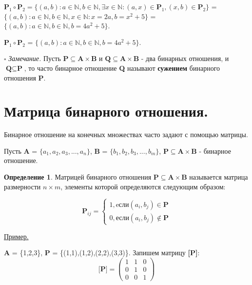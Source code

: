 \documentclass[12pt, a4paper, oneside]{article}
\theoremstyle{plain} %
\theoremstyle{definition}
\newtheorem*{definition}{Определение}  %
\newcommand{\indef}[1]{\textbf{ \color{dark_red} #1}}
\begin{document}
$\textbf{P}_1 \circ \textbf{P}_2 = \{(a,b): a \in \mathbb{N}, b \in \mathbb{N}, \exists x \in \mathbb{N}: (a,x) \in \textbf{P}_1, (x,b) \in \textbf{P}_2\}$ = $\{(a,b): a \in \mathbb{N}, b \in \mathbb{N},  x \in \mathbb{N}: x = 2a, b = x^2 + 5\}$ = $\{(a,b): a \in \mathbb{N}, b \in \mathbb{N}, b = 4a^2 + 5\}$. 


$\textbf{P}_1 \circ \textbf{P}_2$ = $\{(a,b): a \in \mathbb{N}, b \in \mathbb{N}, b = 4a^2 + 5\}$. \par 

$\square$ \emph{Замечание.} Пусть $\textbf{P} \subseteq \textbf{A} \times \textbf{B}$ и $\textbf{Q} \subseteq \textbf{A} \times \textbf{B}$ - два бинарных отношения, и $\textbf{Q} \subseteq \textbf{P}$, то часто бинарное отношение \textbf{Q} называют \indef{сужением} бинарного отношения \textbf{P}.

\section{Матрица бинарного отношения.}
Бинарное отношение на конечных множествах часто задают с помощью матрицы.\par 

Пусть \textbf{A} = $\{a_1, a_2, a_3, ..., a_n\}$, \textbf{B} = $\{b_1, b_2, b_3, ..., b_m\}$, $\textbf{P} \subseteq \textbf{A} \times \textbf{B}$ - бинарное отношение. 
\begin{definition}

Матрицей бинарного отношения $\textbf{P} \subseteq \textbf{A} \times \textbf{B}$ называется матрица размерности $n \times m$, элементы которой определяются следующим образом:



$$ 
\mathbf{P}_{ij} =
\begin{cases}
1, \textrm{eсли} (a_i, b_j) \in \mathbf{P} \\
0, \textrm{если} (a_i, b_j) \notin \mathbf{P}
\end{cases}
$$

\end{definition}

\underline{Пример.}\par

\textbf{A} = \{1,2,3\}, \hspace{2mm} \textbf{P} = \{(1,1),(1,2),(2,2),(3,3)\}. Запишем матрицу \textbf{[P]}: \[\textbf{[P]} =
\begin{pmatrix}
1 & 1 & 0\\
0 & 1 & 0\\
0 & 0 & 1
\end{pmatrix}\]
\end{document}

